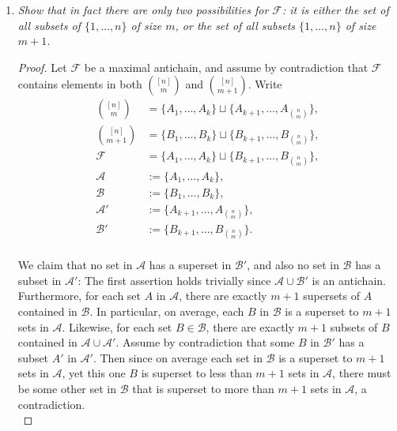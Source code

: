 \documentclass{article}
\begin{document}
\begin{enumerate}
\begin{enumerate}
      \item \it Show that in fact there are only two possibilities for
        $\mathcal{F}$: it is either the set of all subsets of
        $\{1,\ldots,n\}$ of size $m$, or the set of all subsets
        $\{1,\ldots,n\}$ of size $m+1$.

        \begin{proof}
          Let $\mathcal{F}$ be a maximal antichain, and assume by
          contradiction that $\mathcal{F}$ contains elements in both
          $\binom{[n]}{m}$ and $\binom{[n]}{m+1}$. Write
          \begin{align*}
            \binom{[n]}{m} &=\{A_1,\ldots,A_k\} \sqcup
              \{A_{k+1},\ldots,A_{\binom{n}{m}}\},\\
            \binom{[n]}{m+1} &=\{B_1,\ldots,B_k\} \sqcup
              \{B_{k+1},\ldots,B_{\binom{n}{m}}\},\\
            \mathcal{F} &=\{A_1,\ldots,A_k\} \sqcup
              \{B_{k+1},\ldots,B_{\binom{n}{m}}\},\\
            \mathcal{A} &:=\{A_1,\ldots,A_k\},\\
            \mathcal{B} &:=\{B_1,\ldots,B_k\},\\
            \mathcal{A}' &:=\{A_{k+1},\ldots,A_{\binom{n}{m}}\},\\
            \mathcal{B}' &:=\{B_{k+1},\ldots,B_{\binom{n}{m}}\}.\\
          \end{align*}

          We claim that no set in $\mathcal{A}$ has a superset in
          $\mathcal{B}'$, and also no set in $\mathcal{B}$ has a subset in
          $\mathcal{A}'$: The first assertion holds trivially since
          $\mathcal{A}\cup\mathcal{B}'$ is an antichain. Furthermore, for
          each set $A$ in $\mathcal{A}$, there are exactly $m+1$ supersets
          of $A$ contained in $\mathcal{B}$. In particular, on average,
          each $B$ in $\mathcal{B}$ is a superset to $m+1$ sets in
          $\mathcal{A}$. Likewise, for each set $B\in\mathcal{B}$, there
          are exactly $m+1$ subsets of $B$ contained in
          $\mathcal{A}\cup\mathcal{A}'$. Assume by contradiction that some
          $B$ in $\mathcal{B}'$ has a subset $A'$ in $\mathcal{A}'$. Then
          since on average each set in $\mathcal{B}$ is a superset to $m+1$
          sets in $\mathcal{A}$, yet this one $B$ is superset to less
          than $m+1$ sets in $\mathcal{A}$, there must be some other set in
          $\mathcal{B}$ that is superset to more than $m+1$ sets in
          $\mathcal{A}$, a contradiction. \\


\end{proof}
\end{enumerate}
\end{enumerate}
\end{document}
